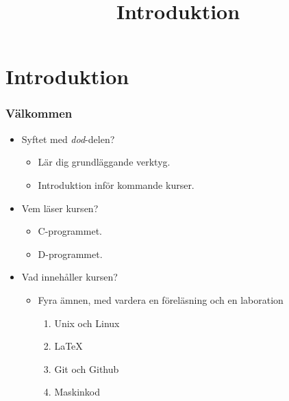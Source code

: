 
\title{Introduktion}
\section{Introduktion}


\begin{frame}[fragile=singleslide]
	\frametitle{Välkommen}
	\begin{itemize}
		\item Syftet med \emph{dod}-delen?
		      \begin{itemize}
			      \item Lär dig grundläggande verktyg.
			      \item Introduktion inför kommande kurser.
		      \end{itemize}
		\item Vem läser kursen?
		      \begin{itemize}
			      \item C-programmet.
			      \item D-programmet.
		      \end{itemize}
		\item Vad innehåller kursen?
		      \begin{itemize}
			      \item Fyra ämnen, med vardera en föreläsning och en laboration
			            \begin{enumerate}
				            \item Unix och Linux
				            \item \LaTeX
				            \item Git och Github
				            \item Maskinkod
			            \end{enumerate}
		      \end{itemize}
	\end{itemize}
\end{frame}


